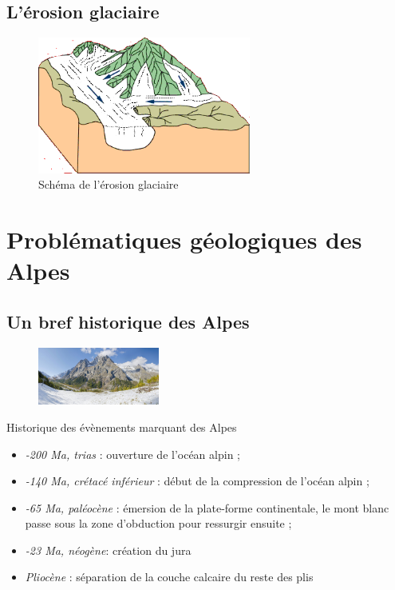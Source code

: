 \documentclass{beamer}
\begin{document}
\subsection{L'érosion glaciaire}
\begin{frame}
  \begin{center}
    \begin{figure}
      \includegraphics[width=7cm]{Images/Diapos/Erosion/Glaciaire/Erosion_glaciaire_Bourque4B.png}
      \caption{Schéma de l'érosion glaciaire}
    \end{figure}
  \end{center}
\end{frame}

\section{Problématiques géologiques des Alpes}

\subsection{Un bref historique des Alpes}
\begin{frame}
	\begin{center}
		\begin{figure}
			\includegraphics[width=4cm]{Images/Images_Alexis/mont_blanc.jpg}
		\end{figure}

		Historique des évènements marquant des Alpes
		\begin{itemize}
		 \item \textit{-200 Ma, trias} : ouverture de l’océan alpin ;
		 \item \textit{-140 Ma, crétacé inférieur} : début de la compression de l’océan alpin ;
		 \item \textit{-65 Ma, paléocène} : émersion de la plate-forme continentale, le mont blanc passe sous la zone d'obduction pour ressurgir ensuite ;
		 \item \textit{-23 Ma, néogène}: création du jura
		 \item \textit{Pliocène} : séparation de la couche calcaire du reste des plis
		\end{itemize}
	\end{center}
\end{frame}
\end{document}
